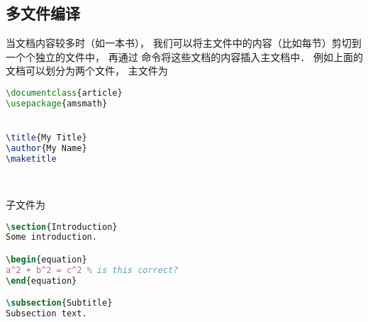 \subsection{多文件编译}
当文档内容较多时（如一本书）， 我们可以将主文件中的内容（比如每节）剪切到一个个独立的文件中， 再通过 \verb|| 命令将这些文档的内容插入主文档中． 例如上面的文档可以划分为两个文件， 主文件为
\begin{lstlisting}[language=latex, caption=test.tex]
\documentclass{article}
\usepackage{amsmath}


\title{My Title}
\author{My Name}
\maketitle




\end{lstlisting}

子文件为
\begin{lstlisting}[language=latex, caption=section1.tex]
\section{Introduction}
Some introduction.

\begin{equation}
a^2 + b^2 = c^2 % is this correct?
\end{equation}

\subsection{Subtitle}
Subsection text.
\end{lstlisting}
